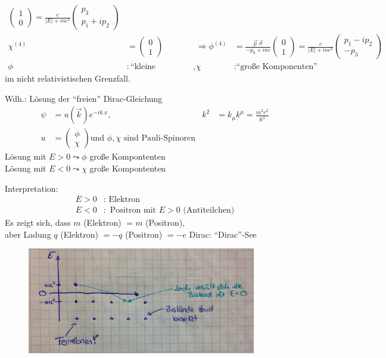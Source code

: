 \begin{enumerate}[1.]
\begin{align*}
			\begin{pmatrix}
			1 \\ 0
			\end{pmatrix}
			= \frac{c}{|E| + mc^2}
			\begin{pmatrix}
			p_3 \\ p_1 + ip_2
			\end{pmatrix} 
			\\
			\chi^{(4)} &= 
			\begin{pmatrix}
			0 \\ 1
			\end{pmatrix}
			&\Rightarrow 
			\phi^{(4)} &= \frac{\vec{p}~\vec{\sigma}}{-p_0 + mc}
			\begin{pmatrix}
			0 \\ 1
			\end{pmatrix}
			= \frac{c}{|E| + mc^2}
			\begin{pmatrix}
			p_1 - ip_2 \\ -p_3
			\end{pmatrix}
			\\
			\phi &: \text{``kleine Komponenten''} ,& \chi &: \text{``große Komponenten''}
		\end{align*}
	im nicht relativistischen Grenzfall.
	\end{enumerate}
Wdh.: Lösung 
der ``freien'' Dirac-Gleichung 
	\begin{align*}
		\psi &= u(\vec{k}) e^{-ik.x} ,&
		k^2 &= k_\mu k^\mu = \frac{m^2 c^2}{\hbar^2} \\
		u &=
		\begin{pmatrix}
		\phi \\
		\chi
		\end{pmatrix}
		\text{und } \phi, \chi \text{ sind Pauli-Spinoren}		
	\end{align*}
Lösung mit $E > 0 \leadsto \phi$ große Kompontenten 
\\
Lösung mit $E < 0 \leadsto \chi$ große Kompontenten

Interpretation:
	\begin{align*}
		E>0 &: \text{ Elektron} \\
		E<0 &: \text{ Positron mit } E>0 \text{ (Antiteilchen)}
	\end{align*}
Es zeigt sich, dass $m$ (Elektron) $= m$ (Positron), 
\\aber Ladung $q$ (Elektron) $= -q$ (Positron) $= -e$
\newpage
Dirac: ``Dirac''-See
	\begin{figure} [h]
		\begin{center}
			\includegraphics[width=10cm]{Dirac-Gleichung1}
		\end{center}
	\end{figure}
	
